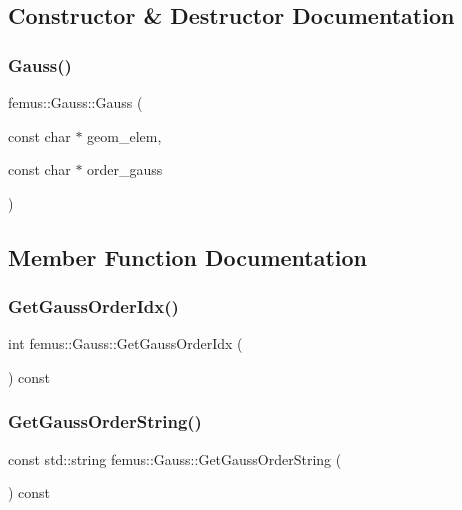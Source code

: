 \subsection{Constructor \& Destructor Documentation}
\mbox{\label{classfemus_1_1_gauss_a0b6754a04d9ecbeb30bc23ed136d2a4a}} 
\subsubsection{\texorpdfstring{Gauss()}{Gauss()}}
{\footnotesize\ttfamily femus\+::\+Gauss\+::\+Gauss (\begin{DoxyParamCaption}\item[{const char $\ast$}]{geom\+\_\+elem,  }\item[{const char $\ast$}]{order\+\_\+gauss }\end{DoxyParamCaption})}



\subsection{Member Function Documentation}
\mbox{\label{classfemus_1_1_gauss_a8dfd801f0e3ed2b6e521126c68f4e92a}} 
\subsubsection{\texorpdfstring{Get\+Gauss\+Order\+Idx()}{GetGaussOrderIdx()}}
{\footnotesize\ttfamily int femus\+::\+Gauss\+::\+Get\+Gauss\+Order\+Idx (\begin{DoxyParamCaption}{ }\end{DoxyParamCaption}) const\hspace{0.3cm}{\ttfamily [inline]}}

\mbox{\label{classfemus_1_1_gauss_a8b30f3ee234af8b2950fefd7b0927610}} 
\subsubsection{\texorpdfstring{Get\+Gauss\+Order\+String()}{GetGaussOrderString()}}
{\footnotesize\ttfamily const std\+::string femus\+::\+Gauss\+::\+Get\+Gauss\+Order\+String (\begin{DoxyParamCaption}{ }\end{DoxyParamCaption}) const\hspace{0.3cm}{\ttfamily [inline]}}

